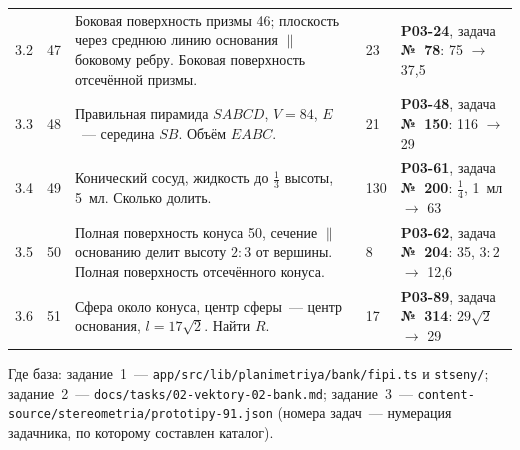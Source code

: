 \documentclass[fontsize=10pt]{scrartcl}
\begin{document}
\begin{longtable}{@{}p{9mm}p{8mm}p{70mm}p{14mm}p{58mm}@{}}
3.2 & 47 & Боковая поверхность призмы 46; плоскость через среднюю линию основания $\parallel$ боковому ребру. Боковая поверхность отсечённой призмы. & 23 & \textbf{P03-24}, задача \textbf{№~78}: 75 $\to$ 37,5\\
3.3 & 48 & Правильная пирамида $SABCD$, $V=84$, $E$~— середина $SB$. Объём $EABC$. & 21 & \textbf{P03-48}, задача \textbf{№~150}: 116 $\to$ 29\\
3.4 & 49 & Конический сосуд, жидкость до $\tfrac13$ высоты, 5~мл. Сколько долить. & 130 & \textbf{P03-61}, задача \textbf{№~200}: $\tfrac14$, 1~мл $\to$ 63\\
3.5 & 50 & Полная поверхность конуса 50, сечение $\parallel$ основанию делит высоту $2:3$ от вершины. Полная поверхность отсечённого конуса. & 8 & \textbf{P03-62}, задача \textbf{№~204}: 35, $3:2$ $\to$ 12,6\\
3.6 & 51 & Сфера около конуса, центр сферы~— центр основания, $l=17\sqrt2$. Найти $R$. & 17 & \textbf{P03-89}, задача \textbf{№~314}: $29\sqrt2$ $\to$ 29\\
\bottomrule
\end{longtable}
Где база: задание~1~— \texttt{app/src/lib/planimetriya/bank/fipi.ts} и \texttt{stseny/}; задание~2~— \texttt{docs/tasks/02-vektory-02-bank.md}; задание~3~— \texttt{content-source/stereometria/prototipy-91.json} (номера задач~— нумерация задачника, по которому составлен каталог).
\end{document}
